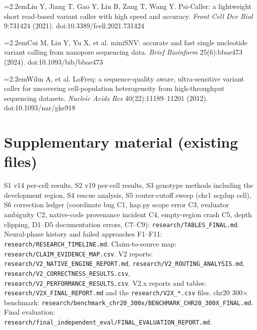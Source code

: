 \documentclass[11pt,a4paper]{article}
\makeatletter
\newcommand{\needspace}[1]{\par\ifdim\pagegoal=\maxdimen\else\dimen@=\pagegoal\advance\dimen@-\pagetotal\ifdim\dimen@<#1\relax\newpage\fi\fi}
\newcommand{\refitem}[2]{\par\noindent\hangindent=2.2em\hangafter=1\makebox[2.2em][l]{[#1]}#2\par\vspace{2pt}}
\makeatother
\begin{document}
\refitem{25}{Liu Y, Jiang T, Gao Y, Liu B, Zang T, Wang Y. Psi-Caller: a lightweight short read-based variant caller with high speed and accuracy. \emph{Front Cell Dev Biol} 9:731424 (2021). doi:10.\allowbreak{}3389/\allowbreak{}fcell.\allowbreak{}2021.\allowbreak{}731424}
\refitem{26}{Cui M, Liu Y, Yu X, et al. miniSNV: accurate and fast single nucleotide variant calling from nanopore sequencing data. \emph{Brief Bioinform} 25(6):bbae473 (2024). doi:10.\allowbreak{}1093/\allowbreak{}bib/\allowbreak{}bbae473}
\refitem{27}{Wilm A, et al. LoFreq: a sequence-quality aware, ultra-sensitive variant caller for uncovering cell-population heterogeneity from high-throughput sequencing datasets. \emph{Nucleic Acids Res} 40(22):11189--11201 (2012). doi:10.\allowbreak{}1093/\allowbreak{}nar/\allowbreak{}gks918}
\FloatBarrier
\needspace{10\baselineskip}
\section*{\texorpdfstring{Supplementary material (existing files)}{Supplementary material (existing files)}}
S1 v14 per-cell results, S2 v19 per-cell results, S3 genotype methods including the development region, S4 rescue analysis, S5 router-cutoff sweep (chr1 segdup cell), S6 correction ledger (coordinate bug C1, hap.py scope error C3, evaluator ambiguity C2, native-code provenance incident C4, empty-region crash C5, depth clipping, D1--D5 documentation errors, C7--C9): \texttt{research/\allowbreak{}TABLES\_\allowbreak{}FINAL.\allowbreak{}md}. Neural-phase history and failed approaches F1--F11: \texttt{research/\allowbreak{}RESEARCH\_\allowbreak{}TIMELINE.\allowbreak{}md}. Claim-to-source map: \texttt{research/\allowbreak{}CLAIM\_\allowbreak{}EVIDENCE\_\allowbreak{}MAP.\allowbreak{}csv}. V2 reports: \texttt{research/\allowbreak{}V2\_\allowbreak{}NATIVE\_\allowbreak{}ENGINE\_\allowbreak{}REPORT.\allowbreak{}md}, \texttt{research/\allowbreak{}V2\_\allowbreak{}ROUTING\_\allowbreak{}ANALYSIS.\allowbreak{}md}, \texttt{research/\allowbreak{}V2\_\allowbreak{}CORRECTNESS\_\allowbreak{}RESULTS.\allowbreak{}csv}, \texttt{research/\allowbreak{}V2\_\allowbreak{}PERFORMANCE\_\allowbreak{}RESULTS.\allowbreak{}csv}. V2.x reports and tables: \texttt{research/\allowbreak{}V2X\_\allowbreak{}FINAL\_\allowbreak{}REPORT.\allowbreak{}md} and the \texttt{research/\allowbreak{}V2X\_\allowbreak{}*.\allowbreak{}csv} files. chr20 300$\times$ benchmark: \texttt{research/\allowbreak{}benchmark\_\allowbreak{}chr20\_\allowbreak{}300x/\allowbreak{}BENCHMARK\_\allowbreak{}CHR20\_\allowbreak{}300X\_\allowbreak{}FINAL.\allowbreak{}md}. Final evaluation: \texttt{research/\allowbreak{}final\_\allowbreak{}independent\_\allowbreak{}eval/\allowbreak{}FINAL\_\allowbreak{}EVALUATION\_\allowbreak{}REPORT.\allowbreak{}md}.
\end{document}
